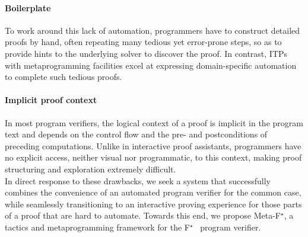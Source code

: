 \documentclass[runningheads]{llncs}
\newcommand\fstar{F$^\star$\xspace}
\newcommand\metafstar{Meta-F$^\star$\xspace}
\newcommand{\comm}[3]{\ifcheckpagebudget\else\ifdraft{{\color{#1}[#2: #3]}}\fi\fi}
\newcommand{\ch}[1]{\comm{teal}{CH}{#1}}
\newcommand{\guido}[1]{\comm{blue}{Guido}{#1}}
\newcommand{\da}[1]{\comm{dkyellow}{Danel}{#1}}
\begin{document}
\paragraph{\bf Boilerplate} To work around this lack of automation,
programmers have to construct detailed proofs by hand, often repeating
many tedious yet error-prone steps, so as to provide hints to the
underlying solver to discover the proof. In contrast, ITPs
with metaprogramming facilities excel at expressing
domain-specific automation to complete such tedious proofs.

\paragraph{\bf Implicit proof context} In most program verifiers,
the logical context of a proof
is implicit in the program text and depends on the control flow and
the pre- and postconditions of preceding computations. Unlike in
interactive proof assistants, programmers have no explicit access,
neither visual nor programmatic, to this context, making proof
structuring and exploration extremely difficult.
\\



In direct response to these drawbacks, we seek a system that successfully 
combines the convenience of an
automated program verifier for the common case, while seamlessly
transitioning to an interactive proving experience for those parts of
a proof that are hard to automate. Towards this end, we
propose \metafstar, a tactics and metaprogramming framework for
the \fstar~\cite{mumon,dm4free} program verifier.
\end{document}

